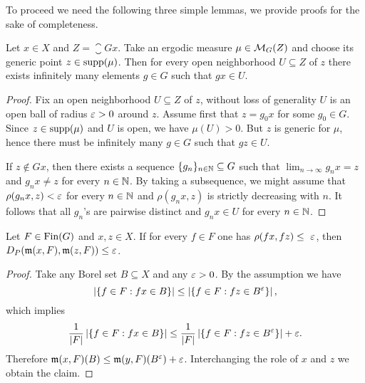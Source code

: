 

To proceed we need the following three simple lemmas, we provide proofs for the sake of completeness. 

\begin{lem}\label{lem:infinitely_many_g_for_x_generic}
Let $x\in X$ and $Z= \closure{Gx}$. Take an ergodic measure $\mu\in\operatorname{\mathcal{M}}_G(Z)$ and choose its generic point $z\in \operatorname{supp} (\mu)$. Then for every open neighborhood $U\subseteq Z$ of $z$ there exists infinitely many elements $g\in G$ such that $gx\in U$.
\end{lem}

\begin{proof}
Fix  an open neighborhood $U\subseteq Z$ of $z$, without loss of generality $U$ is an open ball of radius $\varepsilon>0$ around $z$. 
%
Assume first that $z=g_0x$ for some $g_0\in G$. Since $z\in\operatorname{supp}(\mu)$ and $U$ is open, we have $\mu(U)>0$. 
%
But $z$ is generic for $\mu$, hence there must be infinitely many $g\in G$ such that $gz\in U$.

If $z\notin Gx$, then there exists a sequence $\{g_n\}_{n\in \mathbb{N}}\subseteq G$ such that $\lim_{n\to\infty} g_nx = z$ and $g_nx \neq z$ for every $n\in \mathbb{N}$.
%
By taking a subsequence, we might assume that $\rho(g_nx, z)<\varepsilon$ for every $n\in \mathbb{N}$ and $\rho(g_nx, z)$ is strictly decreasing with $n$. It follows that all $g_n$'s are pairwise distinct and $g_n x\in U$ for every $n\in \mathbb{N}$.
\end{proof}

\begin{lem}\label{szac2}
Let $F\in\operatorname{Fin}(G)$ and $x,z\in X$. If for every $f\in F$ one has $\rho(fx, fz)\leq~\varepsilon$, then $D_P(\operatorname{\mathfrak m}(x, F), \operatorname{\mathfrak m}(z,F))\leq\varepsilon$.
\end{lem}

\begin{proof}
Take any Borel set $B\subseteq X$ and any $\varepsilon>0$.
By the assumption we have
\[
\left|\left\{f\in F:fx\in B\right\}\right|\leq\left|\left\{f\in F:fz\in B^{\varepsilon}\right\}\right|,
\]
which implies
\[
\frac{1}{|F|}\left|\left\{f\in F:fx\in B\right\}\right|\leq\frac{1}{|F|}\left|\left\{f\in F:fz\in B^{\varepsilon}\right\}\right|+\varepsilon.
\]
Therefore $\operatorname{\mathfrak m}(x,F)(B)\leq \operatorname{\mathfrak m}(y,F)(B^{\varepsilon})+\varepsilon$. Interchanging the role of $x$ and $z$ we obtain the claim.
\end{proof}

